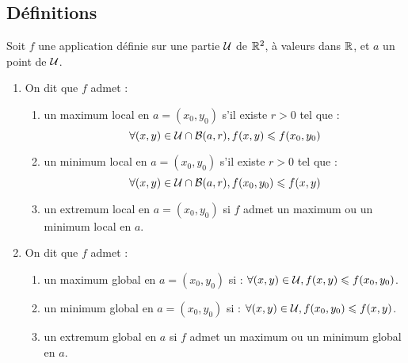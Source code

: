 \subsection{Définitions}
\begin{defi}
    Soit \(f\) une application définie sur une partie \(\cal{U}\) de \(\R^2\), à valeurs dans \(\R\), et \(a\) un point de \(\cal{U}\).
    \begin{enumerate}
        \item On dit que \(f\) admet :
        \begin{enumerate}
            \item un maximum local en \(a = (x_0, y_0)\) s’il existe \(r > 0\) tel que :
                \[\forall (x, y) \in \cal{U} \inter \cal{B}(a, r), f (x, y) \leq f (x_0, y_0)\]
            \item un minimum local en \(a = (x_0, y_0)\) s’il existe \(r > 0\) tel que :
                \[\forall (x, y) \in\cal{U} \inter \cal{B}(a, r), f (x_0, y_0) \leq f (x, y)\]
            \item un extremum local en \(a = (x_0, y_0)\) si \(f\) admet un maximum ou un minimum local en \(a\).
        \end{enumerate}
    \item On dit que \(f\) admet :
        \begin{enumerate}
            \item un maximum global en \(a = (x_0, y_0)\) si : \(\forall (x, y) \in\cal{U}, f (x, y) \leq f (x_0, y_0)\).
            \item un minimum global en \(a = (x_0, y_0)\) si : \(\forall (x, y) \in\cal{U}, f (x_0, y_0) \leq f (x, y)\).
            \item un extremum global en \(a\) si \(f\) admet un maximum ou un minimum global en \(a\).
        \end{enumerate}
    \end{enumerate}
\end{defi}
